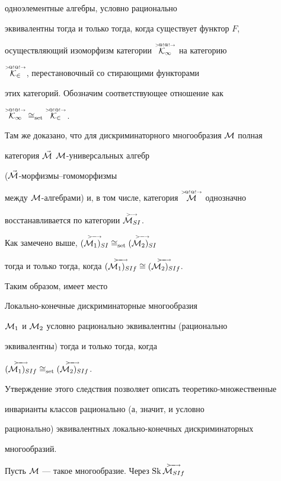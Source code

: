 одноэлементные алгебры, условно рационально


эквивалентны тогда и только тогда, когда существует функтор $F$,


осуществляющий изоморфизм категории $\overset{{\scriptscriptstyle >\!@!@!\to}}{\cal K_1}{}$ на категорию


$\overset{{\scriptscriptstyle >\!@!@!\to}}{\cal K_2}{}$, перестановочный со стирающими функторами


этих категорий. Обозначим соответствующее отношение  как


$\overset{{\scriptscriptstyle >\!@!@!\to}}{\cal K_1}{}\cong_{\text{set}}\overset{{\scriptscriptstyle >\!@!@!\to}}{\cal K_2}{}$.


Там же доказано, что для дискриминаторного многообразия ${\cal M}$ полная


категория $\vec{{\cal M}}$\; ${\cal M}$-универсальных алгебр


($\vec{{\cal M}}$-морфизмы--гомоморфизмы


между ${\cal M}$-алгебрами) и, в том числе, категория $\overset{{\scriptscriptstyle >\!@!@!\to}}{{\cal M}}{}$ однозначно


восстанавливается по категории $\overset{{\scriptscriptstyle >\!\!\longrightarrow}}{{\cal M}_{SI}}{}$.


Как замечено выше, $\GAR{(\M_1)_{SI}}\cong_{\text{set}}\GAR{(\M_2)_{SI}}$


тогда и только тогда, когда $\GAR{(\M_1)_{SIf}}\cong\GAR{(\M_2)_{SIf}}$.


Таким образом, имеет место





\begin{cornonum} Локально-конечные дискриминаторные многообразия


${\cal M}_1$ и ${\cal M}_2$ условно рационально эквивалентны (рационально


эквивалентны) тогда и только тогда, когда


$\GAR{(\M_1)_{SIf}}\cong_{\text{set}}\GAR{(\M_2)_{SIf}}$.


\end{cornonum}





Утверждение этого следствия позволяет описать теоретико-множественные


инварианты классов рационально (а, значит, и условно


рационально) эквивалентных локально-конечных дискриминаторных


многообразий.





Пусть ${\cal M}$ --- такое многообразие. Через $\Sk \GAR{\M_{SIf}}$



